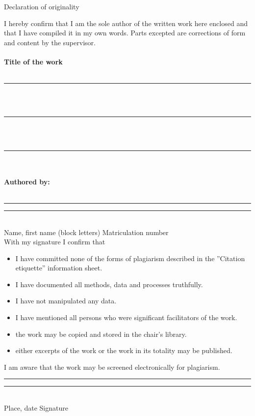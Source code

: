 


\begin{center} {\LARGE Declaration of originality} \end{center}



I hereby confirm that I am the sole author of the written work here enclosed and that I have compiled it in my own words. Parts excepted are corrections of form and content by the supervisor.\\ \vspace{0.4cm}\\
\textbf{Title of the work}\\
\vspace{0.4cm}\\
\noindent \rule[1ex]{\textwidth}{1pt}\\
\\
\noindent \rule[1ex]{\textwidth}{1pt}\\
\\
\noindent \rule[1ex]{\textwidth}{1pt}\\
\vspace{0.3cm}\\
\textbf{Authored by:}\\
\vspace{0.5cm}\\
\noindent\rule[1ex]{30ex}{1pt} \hspace{15ex} \rule[1ex]{30ex}{1pt}\vspace{-0.2cm}\\
\phantom{} Name, first name (block letters)  \hspace{19ex} Matriculation number\vspace{0.2cm}\\

With my signature I confirm that
\begin{itemize}
    \item I have committed none of the forms of plagiarism described in the ''Citation etiquette'' information sheet.
    \item I have documented all methods, data and processes truthfully.
    \item I have not manipulated any data.
    \item I have mentioned all persons who were significant facilitators of the work.
    \item the work may be copied and stored in the chair's library.
    \item either excerpts of the work or the work in its totality may be published.

\end{itemize}

\vspace{0.3cm}
I am aware that the work may be screened electronically for plagiarism.
\vspace{0.8cm}\\

\noindent\rule[1ex]{30ex}{1pt} \hspace{15ex} \rule[1ex]{30ex}{1pt}\vspace{-0.2cm}\\
\phantom{}\hspace{6ex} Place, date  \hspace{37.5ex} Signature


\cleardoublepage